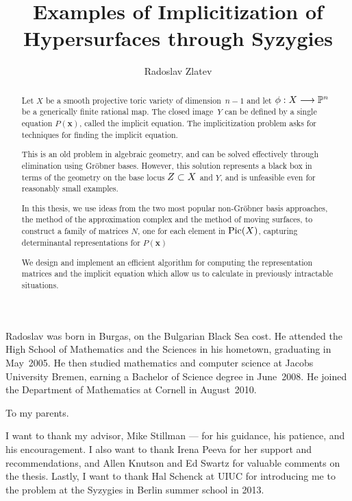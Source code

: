 \documentclass[phd,tocprelim]{cornell}
\title {Examples of Implicitization of Hypersurfaces through Syzygies}
\author {Radoslav Zlatev}
\numberwithin{first}{chapter}
\begin{document}
\maketitle
\makecopyright

\begin{abstract}
Let $X$ be a smooth projective toric variety of dimension~$n-1$
and let $\phi:X\longrightarrow\mathbb{P}^n$ be a generically finite rational map.
The closed image~$Y$ can be defined by a single equation $P(\mathbf x)$,
called the implicit equation.
The implicitization problem asks for techniques for finding the implicit equation.

This is an old problem in algebraic geometry, and can be solved effectively
through elimination using Gr\"obner bases.
However, this solution represents
a black box in terms of the geometry on the base locus $Z\subset X$ and $Y$,
and is unfeasible even for reasonably small examples.

In this thesis, we use ideas from the two most popular non-Gr\"obner basis approaches,
the method of the approximation complex and the method of moving surfaces,
to construct a family of matrices $N$, one for each element in $\operatorname{Pic}(X)$,
capturing determinantal representations for $P(\mathbf x)$

We design and implement an efficient algorithm for computing the representation matrices
and the implicit equation which allow us to calculate in previously intractable situations.
\end{abstract}

\begin{biosketch}
Radoslav was born in Burgas, on the Bulgarian Black Sea cost.
He attended the High School of Mathematics and the Sciences in his hometown, graduating in May~2005.
He then studied mathematics and computer science at Jacobs University Bremen,
earning a Bachelor of Science degree in June~2008.
He joined the Department of Mathematics at Cornell in August~2010.
\end{biosketch}

\begin{dedication}
To my parents.
\end{dedication}

\begin{acknowledgements}
I want to thank my advisor, Mike Stillman ---
for his guidance, his patience, and his encouragement.
I also want to thank
Irena Peeva for her support and recommendations, and
Allen Knutson and Ed Swartz for valuable comments on the thesis.
Lastly, I want to thank
Hal Schenck at UIUC  for introducing me to the problem
at the Syzygies in Berlin summer school in 2013.
\end{acknowledgements}
\end{document}
